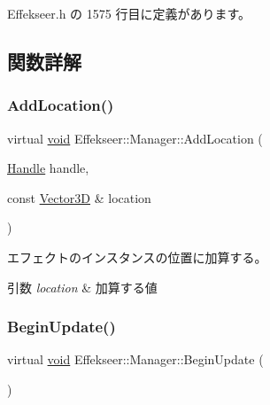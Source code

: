  Effekseer.\+h の 1575 行目に定義があります。



\subsection{関数詳解}
\mbox{\label{class_effekseer_1_1_manager_a8f391814f681fc7acc4e8ed785c80cbc}} 
\subsubsection{\texorpdfstring{Add\+Location()}{AddLocation()}}
{\footnotesize\ttfamily virtual \mbox{\hyperlink{namespace_effekseer_ab34c4088e512200cf4c2716f168deb56}{void}} Effekseer\+::\+Manager\+::\+Add\+Location (\begin{DoxyParamCaption}\item[{\mbox{\hyperlink{namespace_effekseer_afba58b8d812da862190e9bbfc040824a}{Handle}}}]{handle,  }\item[{const \mbox{\hyperlink{struct_effekseer_1_1_vector3_d}{Vector3D}} \&}]{location }\end{DoxyParamCaption})\hspace{0.3cm}{\ttfamily [pure virtual]}}



エフェクトのインスタンスの位置に加算する。 


\begin{DoxyParams}{引数}
{\em location} & 加算する値 \\
\hline
\end{DoxyParams}
\mbox{\label{class_effekseer_1_1_manager_a8b9585b3bee11d4d0d7b29b742178f96}} 
\subsubsection{\texorpdfstring{Begin\+Update()}{BeginUpdate()}}
{\footnotesize\ttfamily virtual \mbox{\hyperlink{namespace_effekseer_ab34c4088e512200cf4c2716f168deb56}{void}} Effekseer\+::\+Manager\+::\+Begin\+Update (\begin{DoxyParamCaption}{ }\end{DoxyParamCaption})\hspace{0.3cm}{\ttfamily [pure virtual]}}



